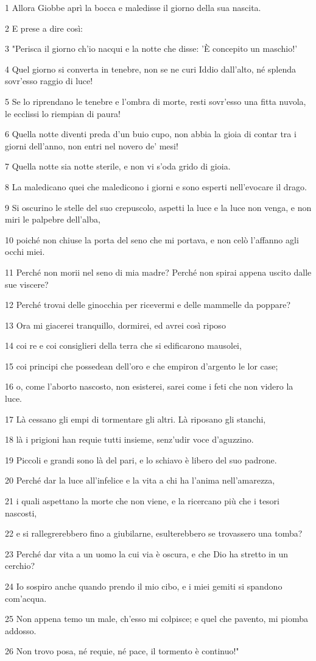\par 1 Allora Giobbe aprì la bocca e maledisse il giorno della sua nascita.
\par 2 E prese a dire così:
\par 3 "Perisca il giorno ch'io nacqui e la notte che disse: 'È concepito un maschio!'
\par 4 Quel giorno si converta in tenebre, non se ne curi Iddio dall'alto, né splenda sovr'esso raggio di luce!
\par 5 Se lo riprendano le tenebre e l'ombra di morte, resti sovr'esso una fitta nuvola, le ecclissi lo riempian di paura!
\par 6 Quella notte diventi preda d'un buio cupo, non abbia la gioia di contar tra i giorni dell'anno, non entri nel novero de' mesi!
\par 7 Quella notte sia notte sterile, e non vi s'oda grido di gioia.
\par 8 La maledicano quei che maledicono i giorni e sono esperti nell'evocare il drago.
\par 9 Si oscurino le stelle del suo crepuscolo, aspetti la luce e la luce non venga, e non miri le palpebre dell'alba,
\par 10 poiché non chiuse la porta del seno che mi portava, e non celò l'affanno agli occhi miei.
\par 11 Perché non morii nel seno di mia madre? Perché non spirai appena uscito dalle sue viscere?
\par 12 Perché trovai delle ginocchia per ricevermi e delle mammelle da poppare?
\par 13 Ora mi giacerei tranquillo, dormirei, ed avrei così riposo
\par 14 coi re e coi consiglieri della terra che si edificarono mausolei,
\par 15 coi principi che possedean dell'oro e che empiron d'argento le lor case;
\par 16 o, come l'aborto nascosto, non esisterei, sarei come i feti che non videro la luce.
\par 17 Là cessano gli empi di tormentare gli altri. Là riposano gli stanchi,
\par 18 là i prigioni han requie tutti insieme, senz'udir voce d'aguzzino.
\par 19 Piccoli e grandi sono là del pari, e lo schiavo è libero del suo padrone.
\par 20 Perché dar la luce all'infelice e la vita a chi ha l'anima nell'amarezza,
\par 21 i quali aspettano la morte che non viene, e la ricercano più che i tesori nascosti,
\par 22 e si rallegrerebbero fino a giubilarne, esulterebbero se trovassero una tomba?
\par 23 Perché dar vita a un uomo la cui via è oscura, e che Dio ha stretto in un cerchio?
\par 24 Io sospiro anche quando prendo il mio cibo, e i miei gemiti si spandono com'acqua.
\par 25 Non appena temo un male, ch'esso mi colpisce; e quel che pavento, mi piomba addosso.
\par 26 Non trovo posa, né requie, né pace, il tormento è continuo!"

